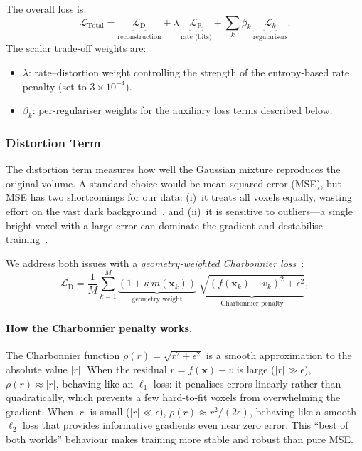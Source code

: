 \documentclass[11pt,a4paper]{article}
\begin{document}
The overall loss is:
\begin{equation}
\mathcal{L}_{\mathrm{Total}} = \underbrace{\mathcal{L}_{\mathrm{D}}}_{\text{reconstruction}} + \lambda\,\underbrace{\mathcal{L}_{\mathrm{R}}}_{\text{rate (bits)}} + \sum_k \beta_k\,\underbrace{\mathcal{L}_k}_{\text{regularisers}}.
\label{eq:total_loss}
\end{equation}
The scalar trade-off weights are:
\begin{itemize}
    \item $\lambda$: rate--distortion weight controlling the strength of the entropy-based rate penalty (set to $3\times10^{-4}$).
    \item $\beta_k$: per-regulariser weights for the auxiliary loss terms described below.
\end{itemize}

\subsubsection{Distortion Term}

The distortion term measures how well the Gaussian mixture reproduces the original volume.  A standard choice would be mean squared error (MSE), but MSE has two shortcomings for our data: (i)~it treats all voxels equally, wasting effort on the vast dark background~\cite{wang2004image}, and (ii)~it is sensitive to outliers---a single bright voxel with a large error can dominate the gradient and destabilise training~\cite{barron2019general}.

We address both issues with a \emph{geometry-weighted Charbonnier loss}~\cite{charbonnier1994two}:
\begin{equation}
\mathcal{L}_{\mathrm{D}} = \frac{1}{M}\sum_{k=1}^{M} \underbrace{(1+\kappa\, m(\mathbf{x}_k))}_{\text{geometry weight}}\;\underbrace{\sqrt{(f(\mathbf{x}_k)-v_k)^2+\epsilon^2}}_{\text{Charbonnier penalty}},
\label{eq:distortion}
\end{equation}

\paragraph{How the Charbonnier penalty works.}
The Charbonnier function $\rho(r) = \sqrt{r^2 + \epsilon^2}$ is a smooth approximation to the absolute value $|r|$.  When the residual $r = f(\mathbf{x}) - v$ is large ($|r| \gg \epsilon$), $\rho(r) \approx |r|$, behaving like an $\ell_1$ loss: it penalises errors linearly rather than quadratically, which prevents a few hard-to-fit voxels from overwhelming the gradient.  When $|r|$ is small ($|r| \ll \epsilon$), $\rho(r) \approx r^2/(2\epsilon)$, behaving like a smooth $\ell_2$ loss that provides informative gradients even near zero error.  This ``best of both worlds'' behaviour makes training more stable and robust than pure MSE.
\end{document}
